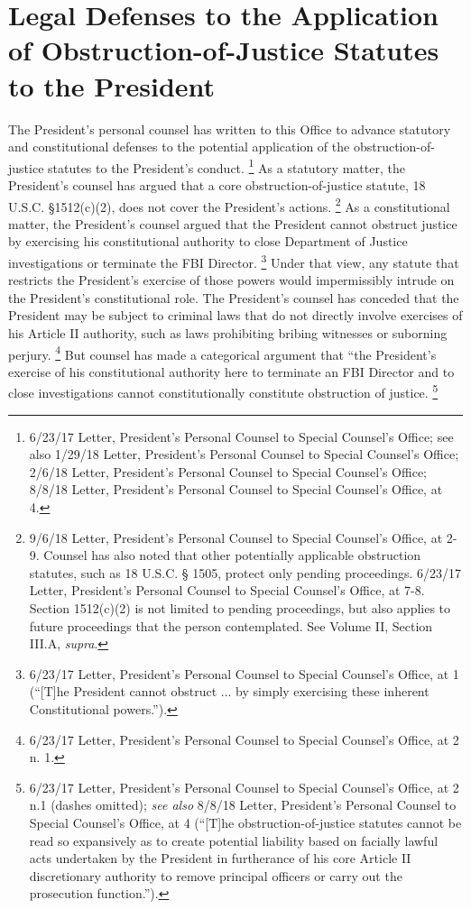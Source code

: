 \section{Legal Defenses to the Application of Obstruction-of-Justice Statutes to the President}

The President’s personal counsel has written to this Office to advance statutory and constitutional defenses to the potential application of the obstruction-of-justice statutes to the President’s conduct.%
\footnote{6/23/17 Letter, President’s Personal Counsel to Special Counsel’s Office;
see also 1/29/18 Letter, President’s Personal Counsel to Special Counsel’s Office;
2/6/18 Letter, President’s Personal Counsel to Special Counsel’s Office;
8/8/18 Letter, President’s Personal Counsel to Special Counsel’s Office, at 4.}
As a statutory matter, the President’s counsel has argued that a core obstruction-of-justice statute, 18 U.S.C. \S 1512(c)(2), does not cover the President’s actions.%
\footnote{9/6/18 Letter, President’s Personal Counsel to Special Counsel’s Office, at 2-9.
Counsel has also noted that other potentially applicable obstruction statutes, such as 18 U.S.C. § 1505, protect only pending proceedings.
6/23/17 Letter, President’s Personal Counsel to Special Counsel’s Office, at 7-8.
Section 1512(c)(2) is not limited to pending proceedings, but also applies to future proceedings that the person contemplated.
See Volume II, Section III.A, \textit{supra}.}
As a constitutional matter, the President’s counsel argued that the President cannot obstruct justice by exercising his constitutional authority to close Department of Justice investigations or terminate the FBI Director.%
\footnote{6/23/17 Letter, President’s Personal Counsel to Special Counsel’s Office, at 1 (“[T]he President cannot obstruct ... by simply exercising these inherent Constitutional powers.”).}
Under that view, any statute that restricts the President’s exercise of those powers would impermissibly intrude on the President’s constitutional role.
The President’s counsel has conceded that the President may be subject to criminal laws that do not directly involve exercises of his Article II authority, such as laws prohibiting bribing witnesses or suborning perjury.%
\footnote{6/23/17 Letter, President’s Personal Counsel to Special Counsel’s Office, at 2 n. 1.}
But counsel has made a categorical argument that “the President’s exercise of his constitutional authority here to terminate an FBI Director and to close investigations cannot constitutionally constitute obstruction of justice.%
\footnote{6/23/17 Letter, President’s Personal Counsel to Special Counsel’s Office, at 2 n.1 (dashes omitted);
\textit{see also} 8/8/18 Letter, President’s Personal Counsel to Special Counsel’s Office, at 4 (“[T]he obstruction-of-justice statutes cannot be read so expansively as to create potential liability based on facially lawful acts undertaken by the President in furtherance of his core Article II discretionary authority to remove principal officers or carry out the prosecution function.”).}

